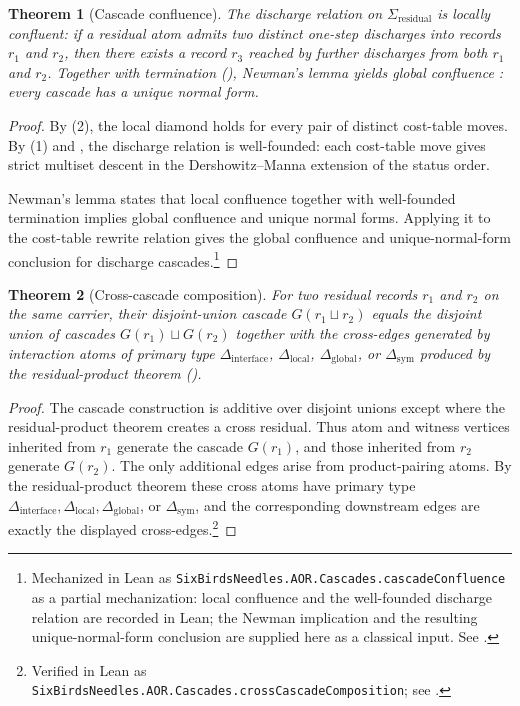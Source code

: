 \documentclass[11pt]{article}
\newcommand{\Sigres}{\Sigma_{\mathrm{residual}}}
\newcommand{\Dinterface}{\Delta_{\mathrm{interface}}}
\newcommand{\Dlocal}{\Delta_{\mathrm{local}}}
\newcommand{\Dglobal}{\Delta_{\mathrm{global}}}
\newcommand{\Dsym}{\Delta_{\mathrm{sym}}}
\newtheorem{theorem}{Theorem}[section]
\theoremstyle{definition}
\begin{document}
\begin{theorem}[Cascade confluence]\label{thm:aor:cascade-confluence}
The discharge relation on $\Sigres$ is locally confluent: if a residual
atom admits two distinct one-step discharges into records $r_1$ and
$r_2$, then there exists a record $r_3$ reached by further discharges
from both $r_1$ and $r_2$.  Together with termination
(), Newman's lemma
\citep{Newman1942Combinatorial} yields global confluence
\citep{Huet1980ConfluentReductions}: every cascade has a unique normal
form.
\end{theorem}

\begin{proof}
By (2), the local diamond holds for
every pair of distinct cost-table moves.  By
(1) and
, the discharge relation is well-founded:
each cost-table move gives strict multiset descent in the
Dershowitz--Manna extension of the status order.

Newman's lemma \citep{Newman1942Combinatorial} states that local confluence
together with well-founded termination implies global confluence and unique
normal forms.  Applying it to the cost-table rewrite relation gives the
global confluence and unique-normal-form conclusion for discharge cascades.\footnote{Mechanized in Lean as
\texttt{SixBirdsNeedles.AOR.Cascades.cascadeConfluence} as a partial
mechanization: local confluence and the well-founded discharge relation are
recorded in Lean; the Newman implication and the resulting
unique-normal-form conclusion are supplied here as a classical input. See
.}
\end{proof}

\begin{theorem}[Cross-cascade composition]\label{thm:aor:cross-cascade-composition}
For two residual records $r_1$ and $r_2$ on the same carrier, their
disjoint-union cascade $G(r_1\sqcup r_2)$ equals the disjoint union of
cascades $G(r_1)\sqcup G(r_2)$ together with the cross-edges generated
by interaction atoms of primary type $\Dinterface$, $\Dlocal$,
$\Dglobal$, or $\Dsym$ produced by the residual-product theorem
().
\end{theorem}

\begin{proof}
The cascade construction is additive over disjoint unions except where the
residual-product theorem creates a cross residual.  Thus atom and witness
vertices inherited from \(r_1\) generate the cascade \(G(r_1)\), and those
inherited from \(r_2\) generate \(G(r_2)\).  The only additional edges arise
from product-pairing atoms.  By the residual-product theorem these cross
atoms have primary type \(\Dinterface,\Dlocal,\Dglobal\), or \(\Dsym\), and
the corresponding downstream edges are exactly the displayed cross-edges.\footnote{Verified in Lean as \texttt{SixBirdsNeedles.AOR.Cascades.crossCascadeComposition}; see .}
\end{proof}
\end{document}
